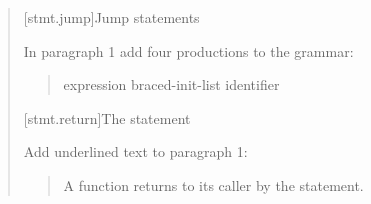 \begin{quote}
%
%
%
%
%
%
%

\setcounter{section}{5}
[stmt.jump]{Jump statements}%

In paragraph 1 add four productions to the grammar:

\begin{quote}
\begin{bnf}
	\br
	\br
	\br
	 expression\opt \terminal{;}\br
	 braced-init-list \terminal{;}\br
	\br
  \br
  \br
	\br
	 identifier \terminal{;}
\end{bnf}
\end{quote}

\setcounter{subsection}{2}
[stmt.return]{The  statement}%
%
%

Add underlined text to paragraph 1:

\begin{quote}
\pnum
A function returns to its caller by the  statement.
\end{quote}


\end{quote}
